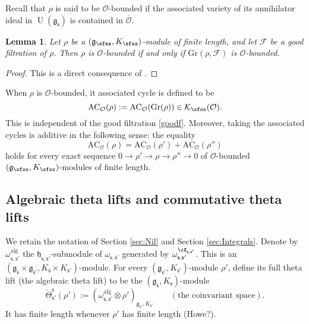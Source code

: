 \documentclass[12pt,a4paper]{amsart}
\newcommand{\CF}{{\mathcal {F}}}
\newcommand{\CK}{{\mathcal {K}}}
\newcommand{\CO}{{\mathcal {O}}}
\newcommand{\oU}{\operatorname{U}}
\newcommand{\g}{\mathfrak g}
\newcommand{\h}{\mathfrak h}
\numberwithin{equation}{section}
\newtheorem{lem}[thm]{Lemma}
\theoremstyle{remark}
\begin{document}
Recall that $\rho$ is said to be $\CO$-bounded if the associated variety of its annihilator ideal in $\oU(\g_\mathsf s)$ is contained in  $\overline \CO$. 

\begin{lem}\label{l62}
Let $\rho$ be a $(\g_\sfss, K_{\sfss})$-module  of finite length,  and let $\CF$ be a  good filtration of $\rho$. Then $\rho$ is $\CO$-bounded if and only if $\mathrm{Gr}(\rho, \CF)$ is $\CO$-bounded. 
\end{lem}
\begin{proof}
This is a direct consequence of   \cite[Theorem 8.4]{Vo89}. 
\end{proof}

When $\rho$ is  $\CO$-bounded, it associated cycle is defined to be
\[
   \mathrm{AC}_\CO(\rho):= \mathrm{AC}_\CO(\mathrm{Gr}(\rho))\in  \CK_\sfss(\CO).
\]
This is independent of the good filtration \eqref{goodf}. Moreover, taking the associated cycles is additive in the following sense: the equality 
\[
 \mathrm{AC}_\CO(\rho)= \mathrm{AC}_\CO(\rho')+ \mathrm{AC}_\CO(\rho'')
\]
holds for every exact sequence 
$0\rightarrow \rho'\rightarrow \rho\rightarrow \rho''\rightarrow 0$ of  $\CO$-bounded  $(\g_\sfss, K_{\sfss})$-modules of finite length. 



\subsection{Algebraic theta lifts and commutative theta lifts}


We retain the notation of Section \ref{sec:Nil} and Section \ref{sec:Integrals}. 
Denote by $\omega^{\mathrm{alg}}_{\mathsf s, \mathsf s'}$ the $\h_{\mathsf s, \mathsf s'}$-submodule of $\omega_{\mathsf s, \mathsf s'}$ generated by  $ \omega_{\mathsf s, \mathsf s'}^{\cX_{\mathsf s, \mathsf s'}}$. This is an $(\g_\mathsf s\times \g_{\mathsf s'}, K_\mathsf s\times K_{\mathsf s'})$-module. For every $ (\g_{\mathsf s'}, K_{\mathsf s'})$-module $\rho'$, define its full theta lift (the algebraic theta lift) to be the $(\g_{\mathsf s}, K_{\mathsf s})$-module
\[
   \check \Theta_{\mathsf s'}^{\mathsf s}(\rho'):=(\omega^{\mathrm{alg}}_{\mathsf s, \mathsf s'}\otimes \rho')_{\g_{\mathsf s'}, K_{\mathsf s'}} \qquad (\textrm{the  coinvariant space}).
\]
It has finite length whenever $\rho'$ has finite length (Howe?).
\end{document}
